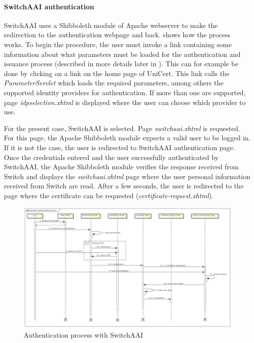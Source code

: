 \documentclass[oneside]{scrreprt}
\newcommand{\unicert}{\mbox{UniCert}}
\begin{document}
\paragraph*{SwitchAAI authentication} SwitchAAI uses a Shibboleth module of Apache webserver to make the redirection to the authentication webpage and back.  shows how the process works. To begin the procedure, the user must invoke a link containing some information about what parameters must be loaded for the authentication and issuance process (described in more details later in ). This can for example be done by clicking on a link on the home page of \unicert. This link calls the \textit{ParameterServlet} which loads the required parameters, among others the supported identity providers for authentication. If more than one are supported, page \textit{idpselection.xhtml} is displayed where the user can choose which provider to use.

For the present case, SwitchAAI is selected. Page \textit{switchaai.xhtml} is requested. For this page, the Apache Shibboleth module expects a valid user to be logged in. If it is not the case, the user is redirected to SwitchAAI authentication page. Once the credentials entered and the user successfully authenticated by SwitchAAI, the Apache Shibboleth module verifies the response received from Switch and displays the \textit{switchaai.xhtml} page where the user personal information received from Switch are read. After a few seconds, the user is redirected to the page where the certificate can be requested (\textit{certificate-request.xhtml}).

\begin{figure}[ht]
\centerline{
\includegraphics[width=1.0\textwidth]{figs/authentication_process_switch}}
\caption{Authentication process with SwitchAAI}
\label{fig:auth_process_switch}
\end{figure}
\end{document}
